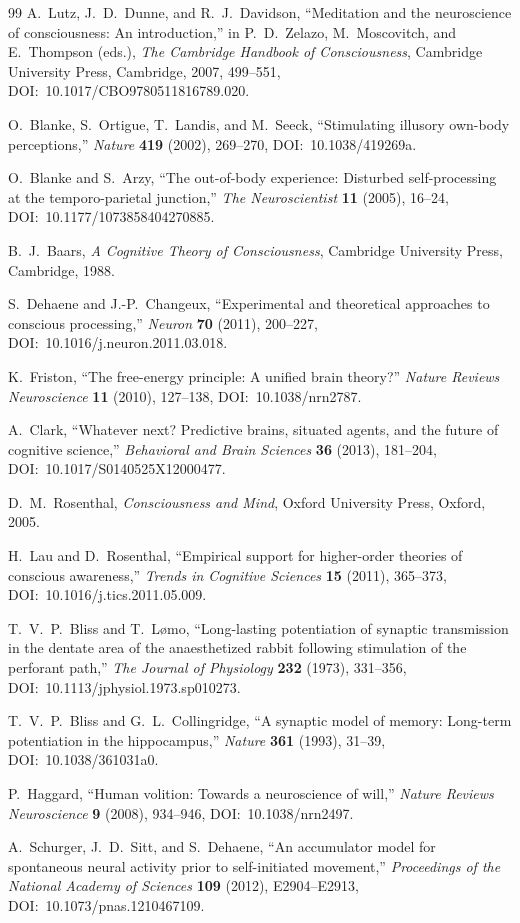 \documentclass[12pt]{article}
\theoremstyle{definition}
\theoremstyle{remark}
\begin{document}
\begin{thebibliography}{99}
A.~Lutz, J.~D.~Dunne, and R.~J.~Davidson,
``Meditation and the neuroscience of consciousness: An introduction,''
in P.~D.~Zelazo, M.~Moscovitch, and E.~Thompson (eds.),
\emph{The Cambridge Handbook of Consciousness},
Cambridge University Press, Cambridge, 2007, 499--551,
DOI:~10.1017/CBO9780511816789.020.

O.~Blanke, S.~Ortigue, T.~Landis, and M.~Seeck,
``Stimulating illusory own-body perceptions,''
\emph{Nature} \textbf{419} (2002), 269--270,
DOI:~10.1038/419269a.

O.~Blanke and S.~Arzy,
``The out-of-body experience: Disturbed self-processing at the
temporo-parietal junction,''
\emph{The Neuroscientist} \textbf{11} (2005), 16--24,
DOI:~10.1177/1073858404270885.

B.~J.~Baars,
\emph{A Cognitive Theory of Consciousness},
Cambridge University Press, Cambridge, 1988.

S.~Dehaene and J.-P.~Changeux,
``Experimental and theoretical approaches to conscious processing,''
\emph{Neuron} \textbf{70} (2011), 200--227,
DOI:~10.1016/j.neuron.2011.03.018.

K.~Friston,
``The free-energy principle: A unified brain theory?''
\emph{Nature Reviews Neuroscience} \textbf{11} (2010), 127--138,
DOI:~10.1038/nrn2787.

A.~Clark,
``Whatever next? Predictive brains, situated agents, and the future of
cognitive science,''
\emph{Behavioral and Brain Sciences} \textbf{36} (2013), 181--204,
DOI:~10.1017/S0140525X12000477.

D.~M.~Rosenthal,
\emph{Consciousness and Mind},
Oxford University Press, Oxford, 2005.

H.~Lau and D.~Rosenthal,
``Empirical support for higher-order theories of conscious awareness,''
\emph{Trends in Cognitive Sciences} \textbf{15} (2011), 365--373,
DOI:~10.1016/j.tics.2011.05.009.

T.~V.~P.~Bliss and T.~L{\o}mo,
``Long-lasting potentiation of synaptic transmission in the dentate
area of the anaesthetized rabbit following stimulation of the perforant
path,''
\emph{The Journal of Physiology} \textbf{232} (1973), 331--356,
DOI:~10.1113/jphysiol.1973.sp010273.

T.~V.~P.~Bliss and G.~L.~Collingridge,
``A synaptic model of memory: Long-term potentiation in the
hippocampus,''
\emph{Nature} \textbf{361} (1993), 31--39,
DOI:~10.1038/361031a0.

P.~Haggard,
``Human volition: Towards a neuroscience of will,''
\emph{Nature Reviews Neuroscience} \textbf{9} (2008), 934--946,
DOI:~10.1038/nrn2497.

A.~Schurger, J.~D.~Sitt, and S.~Dehaene,
``An accumulator model for spontaneous neural activity prior to
self-initiated movement,''
\emph{Proceedings of the National Academy of Sciences} \textbf{109}
(2012), E2904--E2913,
DOI:~10.1073/pnas.1210467109.

\end{thebibliography}
\end{document}
